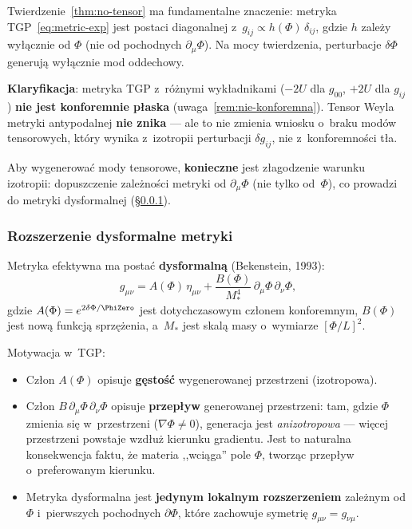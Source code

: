 \begin{remark}\label{rem:tensor-consequence}
Twierdzenie~\ref{thm:no-tensor} ma fundamentalne znaczenie:
metryka TGP~\eqref{eq:metric-exp} jest postaci
diagonalnej z~$g_{ij} \propto h(\Phi)\,\delta_{ij}$,
gdzie $h$ zale\.zy wy\l{}\k{a}cznie od $\Phi$
(nie od pochodnych $\partial_\mu\Phi$).
Na mocy twierdzenia, perturbacje $\delta\Phi$ generuj\k{a}
wy\l{}\k{a}cznie mod oddechowy.

\medskip\noindent
\textbf{Klaryfikacja}: metryka TGP z~r\'o\.znymi
wyk\l{}adnikami ($-2U$ dla $g_{00}$, $+2U$ dla $g_{ij}$)
\textbf{nie jest konforemnie p\l{}aska}
(uwaga~\ref{rem:nie-konforemna}). Tensor Weyla
metryki antypodalnej \textbf{nie znika} ---
ale to nie zmienia wniosku o~braku mod\'ow tensorowych,
kt\'ory wynika z~izotropii perturbacji $\delta g_{ij}$,
nie z~konforemno\'sci t\l{}a.

\medskip\noindent
Aby wygenerowa\'c mody tensorowe,
\textbf{konieczne} jest z\l{}agodzenie warunku
izotropii: dopuszczenie zale\.zno\'sci metryki od
$\partial_\mu\Phi$ (nie tylko od~$\Phi$), co prowadzi
do metryki dysformalnej (\S\ref{sssec:disformal}).
\end{remark}

\subsubsection{Rozszerzenie dysformalne metryki}\label{sssec:disformal}

\begin{hypothesis}\label{hyp:disformal}
Metryka efektywna ma posta\'c \textbf{dysformaln\k{a}}
(Bekenstein, 1993):
\begin{equation}\label{eq:disformal-metric-formalizm}
  \boxed{
    g_{\mu\nu}
    = A(\Phi)\,\eta_{\mu\nu}
    + \frac{B(\Phi)}{M_*^4}\,\partial_\mu\Phi\,\partial_\nu\Phi,
  }
\end{equation}
gdzie $A(\Phi) = e^{2\delta\Phi/\PhiZero}$ jest dotychczasowym
cz\l{}onem konforemnym, $B(\Phi)$ jest now\k{a} funkcj\k{a}
sprz\k{e}\.zenia, a~$M_*$ jest skal\k{a} masy
o~wymiarze $[\Phi/L]^2$.
\end{hypothesis}

Motywacja w~TGP:
\begin{itemize}[nosep]
  \item Cz\l{}on $A(\Phi)$ opisuje \textbf{g\k{e}sto\'s\'c}
    wygenerowanej przestrzeni (izotropowa).
  \item Cz\l{}on $B\,\partial_\mu\Phi\,\partial_\nu\Phi$ opisuje
    \textbf{przep\l{}yw} generowanej przestrzeni:
    tam, gdzie $\Phi$ zmienia si\k{e} w~przestrzeni
    ($\nabla\Phi \neq 0$), generacja jest \emph{anizotropowa}
    --- wi\k{e}cej przestrzeni powstaje wzd\l{}u\.z kierunku
    gradientu. Jest to naturalna konsekwencja
    faktu, \.ze materia ,,wci\k{a}ga'' pole $\Phi$,
    tworz\k{a}c przep\l{}yw o~preferowanym kierunku.
  \item Metryka dysformalna jest \textbf{jedynym lokalnym
    rozszerzeniem} zale\.znym od $\Phi$
    i~pierwszych pochodnych $\partial\Phi$, kt\'ore
    zachowuje symetri\k{e} $g_{\mu\nu} = g_{\nu\mu}$.
\end{itemize}

